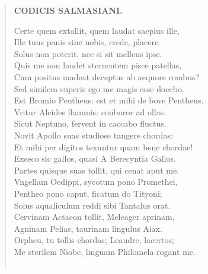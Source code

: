 \documentclass[11pt, a4paper]{report}
\begin{document}
\begin{verse}
    \begin{center} \textbf{CODICIS SALMASIANI.} \end{center} \marginpar{[169]} Certe quem extollit, quem laudat saepius ille, \\ Ille tuus panis sine nobis, crede, placere \\ Solus non poterit, nec si sit melleus ipse. \\ Quis me non laudet sternentem pisce patellas, \\ Cum positus madeat deceptus ab aequore rombus? \\ Sed similem superis ego me magis esse docebo. \\ Est Bromio Pentheus: est et mihi de bove Pentheus. \\ Vritur Alcides flammis: conburor ad ollas. \\ Sicut Neptuno, fervent in caccabo fluctus. \\ Novit Apollo suas studiose tangere chordas: \\ Et mihi per digitos texuntur quam bene chordae! \\ Exseco sic gallos, quasi A Berecyntia Gallos. \\ Partes quisque suas tollit, qui cenat aput me. \\ Vngellam Oedippi, sycotum pono Promethei, \\ Pentheo pono caput, ficatum do Tityoni; \\ Solus aqualiculum reddi sibi Tantalus orat. \\ Cervinam Actaeon tollit, Meleager aprinam, \\ Agninam Pelias, taurinam lingulus Aiax. \\ Orpheu, tu tollis chordas; Leaudre, lacertos; \\ Me sterilem Niobe, linguam Philomela rogant me. \\ 
        ﻿\pagebreak 

\end{verse}
\end{document}
